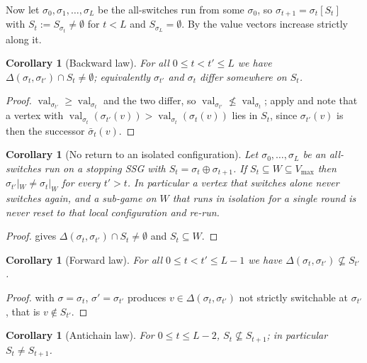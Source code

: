 \documentclass[11pt]{article}
\theoremstyle{plain}
\newtheorem{corollary}[theorem]{Corollary}
\theoremstyle{definition}
\DeclareMathOperator{\val}{val}
\newcommand{\Vmax}{V_{\max}}
\begin{document}
Now let $\sigma_0,\sigma_1,\dots,\sigma_L$ be the all-switches run from
some $\sigma_0$, so $\sigma_{t+1}=\sigma_t[S_t]$ with
$S_t:=S_{\sigma_t}\ne\emptyset$ for $t<L$ and $S_{\sigma_L}=\emptyset$.
By  the value vectors increase strictly along it.

\begin{corollary}[Backward law]\label{cor:no-return}
For all $0\le t<t'\le L$ we have
$\Delta(\sigma_t,\sigma_{t'})\cap S_t\ne\emptyset$; equivalently
$\sigma_{t'}$ and $\sigma_t$ differ somewhere on $S_t$.
\end{corollary}

\begin{proof}
$\val_{\sigma_{t'}}\ge\val_{\sigma_t}$ and the two differ, so
$\val_{\sigma_{t'}}\not\le\val_{\sigma_t}$; apply
 and note that a vertex with
$\val_{\sigma_t}(\sigma_{t'}(v))>\val_{\sigma_t}(\sigma_t(v))$ lies in
$S_t$, since $\sigma_{t'}(v)$ is then the successor
$\bar\sigma_t(v)$.
\end{proof}
\begin{corollary}[No return to an isolated configuration]\label{cor:isolated}
Let $\sigma_0,\dots,\sigma_L$ be an all-switches run on a stopping SSG
with $S_t=\sigma_t\oplus\sigma_{t+1}$. If $S_t\subseteq W\subseteq\Vmax$
then $\sigma_{t'}|_W\ne\sigma_t|_W$ for every $t'>t$. In particular a
vertex that switches alone never switches again, and a sub-game on $W$
that runs in isolation for a single round is never reset to that local
configuration and re-run.
\end{corollary}

\begin{proof}
 gives $\Delta(\sigma_t,\sigma_{t'})\cap S_t\ne\emptyset$
and $S_t\subseteq W$.
\end{proof}


\begin{corollary}[Forward law]\label{cor:law-b}
For all $0\le t<t'\le L-1$ we have
$\Delta(\sigma_t,\sigma_{t'})\not\subseteq S_{t'}$.
\end{corollary}

\begin{proof}
 with $\sigma=\sigma_t$, $\sigma'=\sigma_{t'}$
produces $v\in\Delta(\sigma_t,\sigma_{t'})$ not strictly switchable at
$\sigma_{t'}$, that is $v\notin S_{t'}$.
\end{proof}

\begin{corollary}[Antichain law]\label{cor:antichain}
For $0\le t\le L-2$, $S_t\not\subseteq S_{t+1}$; in particular
$S_t\ne S_{t+1}$.
\end{corollary}
\end{document}
